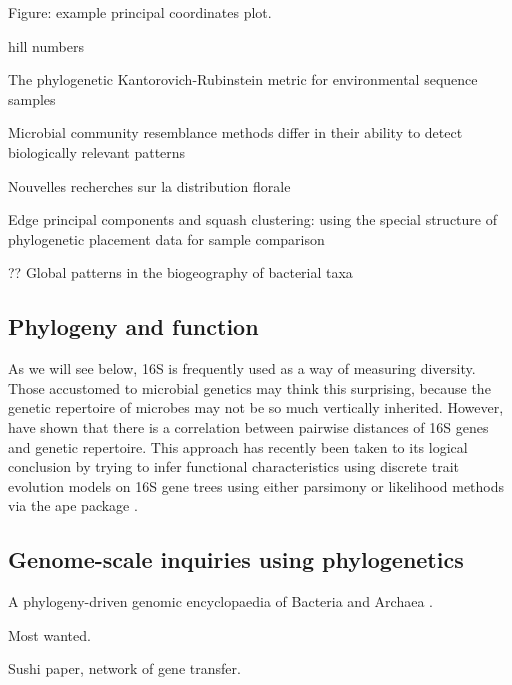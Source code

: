\documentclass{amsart}
\begin{document}
Figure: example principal coordinates plot.

\cite{BikEaMicrobiotaStomach06}

hill numbers
\cite{chao2010phylogenetic}

\cite{evans2012phylogenetic}
The phylogenetic Kantorovich-Rubinstein metric for environmental sequence samples

\cite{kuczynski2010microbial}
Microbial community resemblance methods differ in their ability to detect biologically relevant patterns


\cite{jaccard1908nouvelles}
Nouvelles recherches sur la distribution florale


\cite{matsen2013edge}
Edge principal components and squash clustering: using the special structure of phylogenetic placement data for sample comparison

\cite{PurdomAnalyzingDataGraphs08}


\cite{nemergut2011global}
?? Global patterns in the biogeography of bacterial taxa



\subsection{Phylogeny and function}

As we will see below, 16S is frequently used as a way of measuring diversity.
Those accustomed to microbial genetics may think this surprising, because the genetic repertoire of microbes may not be so much vertically inherited.
However, \citep{zaneveld2010ribosomal} have shown that there is a correlation between pairwise distances of 16S genes and genetic repertoire.
This approach has recently been taken to its logical conclusion by trying to infer functional characteristics using discrete trait evolution models on 16S gene trees \citep{langille2013predictive} using either parsimony \citep{kluge1969quantitative} or likelihood \citep{pagel1994detecting} methods via the ape package \citep{paradis2004ape}.


\subsection{Genome-scale inquiries using phylogenetics}

A phylogeny-driven genomic encyclopaedia of Bacteria and Archaea \cite{wu2009phylogeny}.

Most wanted.

Sushi paper, network of gene transfer.
\end{document}
